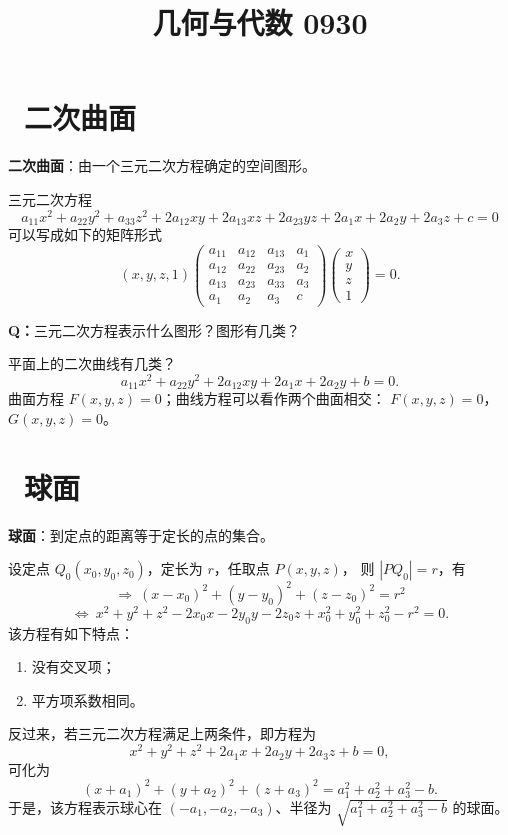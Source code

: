 \documentclass[UTF8,11pt]{ctexart}
\title{几何与代数 0930}
\date{}
\theoremstyle{cnthm}
\begin{document}
\maketitle

\section{\ 二次曲面}

\textbf{二次曲面}：由一个三元二次方程确定的空间图形。

三元二次方程
\[
a_{11}x^2+a_{22}y^2+a_{33}z^2
+2a_{12}xy+2a_{13}xz+2a_{23}yz
+2a_1x+2a_2y+2a_3z+c=0
\]
可以写成如下的矩阵形式
\[
(x,y,z,1)
\begin{pmatrix}
a_{11} & a_{12} & a_{13} & a_1\\
a_{12} & a_{22} & a_{23} & a_2\\
a_{13} & a_{23} & a_{33} & a_3\\
a_1 & a_2 & a_3 & c
\end{pmatrix}
\begin{pmatrix}
x\\y\\z\\1
\end{pmatrix}
=0 .
\]

\textbf{Q：}三元二次方程表示什么图形？图形有几类？

平面上的二次曲线有几类？
\[
a_{11}x^2+a_{22}y^2+2a_{12}xy+2a_1x+2a_2y+b=0 .
\]
曲面方程 $F(x,y,z)=0$；曲线方程可以看作两个曲面相交：
$F(x,y,z)=0$，$G(x,y,z)=0$。

\section{\ 球面}

\textbf{球面}：到定点的距离等于定长的点的集合。

设定点 $Q_0(x_0,y_0,z_0)$，定长为 $r$，任取点 $P(x,y,z)$，
则 $|PQ_0|=r$，有
\[
\Longrightarrow\ (x-x_0)^2+(y-y_0)^2+(z-z_0)^2=r^2
\]
\[
\Longleftrightarrow\
x^2+y^2+z^2-2x_0x-2y_0y-2z_0z
+x_0^2+y_0^2+z_0^2-r^2=0 .
\]
该方程有如下特点：

\begin{enumerate}
\item 没有交叉项；
\item 平方项系数相同。
\end{enumerate}

反过来，若三元二次方程满足上两条件，即方程为
\[
x^2+y^2+z^2+2a_1x+2a_2y+2a_3z+b=0,
\]
可化为
\[
(x+a_1)^2+(y+a_2)^2+(z+a_3)^2
=a_1^2+a_2^2+a_3^2-b .
\]
于是，该方程表示球心在 $(-a_1,-a_2,-a_3)$、半径为
$\sqrt{a_1^2+a_2^2+a_3^2-b}$ 的球面。
\end{document}
